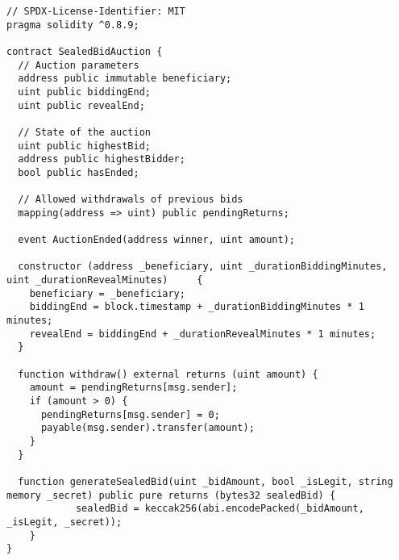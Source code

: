 \begin{lstlisting}[language=Solidity]
// SPDX-License-Identifier: MIT
pragma solidity ^0.8.9;

contract SealedBidAuction {
  // Auction parameters
  address public immutable beneficiary;
  uint public biddingEnd;
  uint public revealEnd;
  
  // State of the auction
  uint public highestBid;
  address public highestBidder;
  bool public hasEnded;
  
  // Allowed withdrawals of previous bids
  mapping(address => uint) public pendingReturns;
  
  event AuctionEnded(address winner, uint amount);

  constructor (address _beneficiary, uint _durationBiddingMinutes, uint _durationRevealMinutes) 	{
    beneficiary = _beneficiary;
    biddingEnd = block.timestamp + _durationBiddingMinutes * 1 minutes;
    revealEnd = biddingEnd + _durationRevealMinutes * 1 minutes;
  }
  
  function withdraw() external returns (uint amount) {
    amount = pendingReturns[msg.sender];
    if (amount > 0) {
      pendingReturns[msg.sender] = 0;
      payable(msg.sender).transfer(amount);
    }
  }
  
  function generateSealedBid(uint _bidAmount, bool _isLegit, string memory _secret) public pure returns (bytes32 sealedBid) {
			sealedBid = keccak256(abi.encodePacked(_bidAmount, _isLegit, _secret));
	}
}
	
\end{lstlisting}
